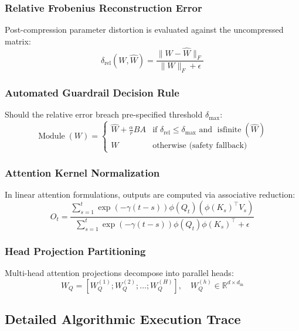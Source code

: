 \subsubsection{Relative Frobenius Reconstruction Error}
Post-compression parameter distortion is evaluated against the uncompressed matrix:
\begin{equation}
\delta_{\text{rel}}(W, \hat{W}) = \frac{\|W - \hat{W}\|_F}{\|W\|_F + \epsilon}
\end{equation}

\subsubsection{Automated Guardrail Decision Rule}
Should the relative error breach pre-specified threshold $\delta_{\text{max}}$:
\begin{equation}
\operatorname{Module}(W) = \begin{cases} \hat{W} + \frac{\alpha}{r} B A & \text{if } \delta_{\text{rel}} \le \delta_{\text{max}} \text{ and } \operatorname{isfinite}(\hat{W}) \\ W & \text{otherwise (safety fallback)} \end{cases}
\end{equation}

\subsubsection{Attention Kernel Normalization}
In linear attention formulations, outputs are computed via associative reduction:
\begin{equation}
O_t = \frac{\sum_{s=1}^{t} \exp(-\gamma (t-s)) \phi(Q_t) (\phi(K_s)^\top V_s)}{\sum_{s=1}^{t} \exp(-\gamma (t-s)) \phi(Q_t) \phi(K_s)^\top + \epsilon}
\end{equation}

\subsubsection{Head Projection Partitioning}
Multi-head attention projections decompose into parallel heads:
\begin{equation}
W_Q = [W_Q^{(1)}; W_Q^{(2)}; \dots; W_Q^{(H)}], \quad W_Q^{(h)} \in \mathbb{R}^{d \times d_{\text{in}}}
\end{equation}

\subsection{Detailed Algorithmic Execution Trace}

